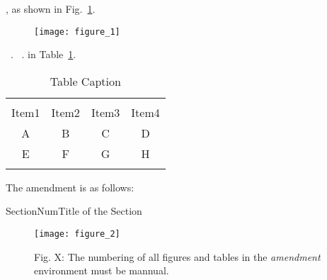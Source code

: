 
\reviewer{}

\begin{question}
\lipsum[1][1-5]
\end{question}

\response
\lipsum[1][6]

\begin{question}
\lipsum[2][1-5]
\end{question}

\response
\lipsum[2][6-10]
\lipsum[2][11], as shown in Fig.~\ref{fig_1}.
\begin{figure}[ht]
    \centering \texttt{[image: figure\_1]}
    \caption{\lipsum[2][12]}
    \label{fig_1}
\end{figure} 

\lipsum[3][1]~\cite{doe2021Title1}.
\lipsum[3][2]~\cite{doe2021Title2,bourne2021Title3}.
\lipsum[3][3] in Table~\ref{table_1}. 

\begin{table}[!h]
	\caption{Table Caption}
	\label{table_1}
	\centering
	\begin{tabular}{c c c c}
		\hline\hline \\ [-3mm]
		Item1    & Item2     & Item3   & Item4 \\ 
		\hline
		A & B & C & D \\
		E & F & G & H \\
		\hline\hline \\ [-3mm]
    \end{tabular}
\end{table}

\lipsum[3][4-8]
The amendment is as follows:
\begin{amendment}{SectionNum}{Title of the Section}
\lipsum[4][1-10]

\begin{figure}[H]
    \centering
    \texttt{[image: figure\_2]}
	\caption*{Fig. X: The numbering of all figures and tables in the \textit{amendment} environment must be mannual.}
    \label{fig_ame_1}
\end{figure}
\end{amendment}




